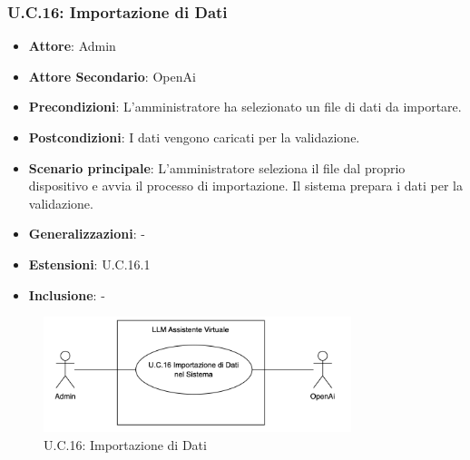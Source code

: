 \subsubsection{U.C.16: Importazione di Dati}
\begin{itemize}
    \item \textbf{Attore}: Admin
    \item \textbf{Attore Secondario}: OpenAi
    \item \textbf{Precondizioni}: L'amministratore ha selezionato un file di dati da importare.
    \item \textbf{Postcondizioni}: I dati vengono caricati per la validazione.
    \item \textbf{Scenario principale}: L'amministratore seleziona il file dal proprio dispositivo e avvia il processo di importazione. 
    Il sistema prepara i dati per la validazione.
    \item \textbf{Generalizzazioni}: -
    \item \textbf{Estensioni}: U.C.16.1
    \item \textbf{Inclusione}: -
\end{itemize}
\begin{figure}[H]
    \centering
    \includegraphics[width=0.8\textwidth]{img/UC16.png}
    \caption{U.C.16: Importazione di Dati}
\end{figure}
\newpage

